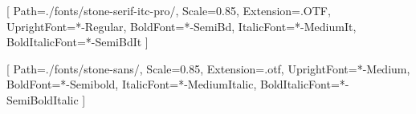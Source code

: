 \usepackage{microtype}
\usepackage{setspace}
\usepackage[all]{nowidow}

\setlength{\parskip}{0em}
\setlength{\parindent}{1em}
\linespread{1}

\newcommand{\titleoriginal}{The Sovereign Individual}
\newcommand{\subtitleoriginal}{Mastering the Transition to the Information Age}
\newcommand{\yearoriginal}{1999}
\newcommand{\subtitletranslation}{De overgang naar het informatietijdperk}
\newcommand{\yeartranslation}{2025}
\newcommand{\stringtranslation}{Vertaling}
\newcommand{\stringlicense}{XXX}
\newcommand{\stringpublisher}{Konsensus Network}
\newcommand{\ISBNHC}{XXX}
\newcommand{\ISBNSC}{XXX}
\newcommand{\ISBNEBOOK}{XXX}
\newcommand{\ISBNAUDIO}{XXX}
\newcommand{\press}{Konsensus Network}
\newcommand{\translatorone}{Vincent Hondius}
\newcommand{\translatortwo}{Theo Hague}
\newcommand{\translators}{
\large\textit{\stringtranslation:}\\
\translatorone\\
\translatortwo\\
}

\setstocksize{210mm}{148mm}
\settrimmedsize{210mm}{148mm}{*}
\setbinding{8mm}
\setlrmarginsandblock{16mm}{18mm}{*}
\setulmarginsandblock{16mm}{15mm}{*}

\usepackage{fontspec}
\setmainfont{stone-serif}[
    Path=./fonts/stone-serif-itc-pro/,
    Scale=0.85,
    Extension=.OTF,
    UprightFont=*-Regular,
    BoldFont=*-SemiBd,
    ItalicFont=*-MediumIt,
    BoldItalicFont=*-SemiBdIt
    ]

\setsansfont{stone-sans}[
    Path=./fonts/stone-sans/,
    Scale=0.85,
    Extension=.otf,
    UprightFont=*-Medium,
    BoldFont=*-Semibold,
    ItalicFont=*-MediumItalic,
    BoldItalicFont=*-SemiBoldItalic
    ]

\usepackage{lettrine}
\setcounter{DefaultLines}{3}
\renewcommand{\DefaultLoversize}{0.1}
\renewcommand{\DefaultLraise}{0}
\renewcommand{\LettrineTextFont}{}
\setlength{\DefaultFindent}{\fontdimen2\font}
\setlength{\DefaultNindent}{0em}

\newcommand{\YUGE}{\fontsize{36pt}{43pt}\selectfont}
\newcommand{\Yuge}{\fontsize{30pt}{36pt}\selectfont}
\newcommand{\yuge}{\fontsize{27pt}{32pt}\selectfont}

